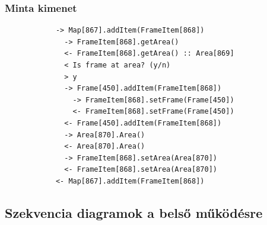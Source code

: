 		\subsubsection*{Minta kimenet}
			\begin{verbatim}
			-> Map[867].addItem(FrameItem[868])
			  -> FrameItem[868].getArea()
			  <- FrameItem[868].getArea() :: Area[869]
			  < Is frame at area? (y/n)
			  > y
			  -> Frame[450].addItem(FrameItem[868])
			    -> FrameItem[868].setFrame(Frame[450])
			    <- FrameItem[868].setFrame(Frame[450])
			  <- Frame[450].addItem(FrameItem[868])
			  -> Area[870].Area()
			  <- Area[870].Area()
			  -> FrameItem[868].setArea(Area[870])
			  <- FrameItem[868].setArea(Area[870])
			<- Map[867].addItem(FrameItem[868])
			\end{verbatim}
	
	\subsection{Szekvencia diagramok a belső működésre}
	
